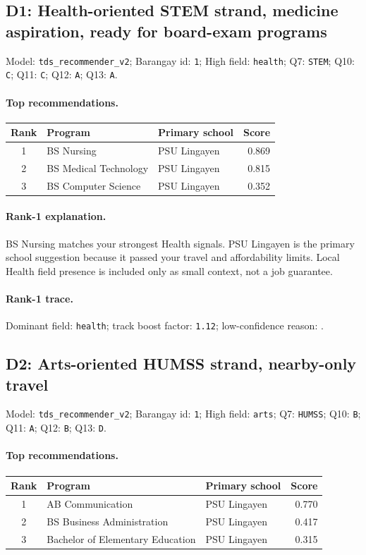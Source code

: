 \subsection*{D1: Health-oriented STEM strand, medicine aspiration, ready for board-exam programs}
\noindent Model: \texttt{tds\_recommender\_v2}; Barangay id: \texttt{1}; High field: \texttt{health}; Q7: \texttt{STEM}; Q10: \texttt{C}; Q11: \texttt{C}; Q12: \texttt{A}; Q13: \texttt{A}.

\paragraph{Top recommendations.}
\begingroup\small\setlength{\tabcolsep}{6pt}
\noindent\begin{tabular}{@{}c p{4.4cm} p{4.4cm} r@{}}
\toprule
Rank & Program & Primary school & Score \\
\midrule
1 & BS Nursing & PSU Lingayen & 0.869 \\
2 & BS Medical Technology & PSU Lingayen & 0.815 \\
3 & BS Computer Science & PSU Lingayen & 0.352 \\
\bottomrule
\end{tabular}\endgroup

\paragraph{Rank-1 explanation.}
BS Nursing matches your strongest Health signals. PSU Lingayen is the primary school suggestion because it passed your travel and affordability limits. Local Health field presence is included only as small context, not a job guarantee.

\paragraph{Rank-1 trace.}
Dominant field: \texttt{health}; track boost factor: \texttt{1.12}; low-confidence reason: \texttt{}.


\subsection*{D2: Arts-oriented HUMSS strand, nearby-only travel}
\noindent Model: \texttt{tds\_recommender\_v2}; Barangay id: \texttt{1}; High field: \texttt{arts}; Q7: \texttt{HUMSS}; Q10: \texttt{B}; Q11: \texttt{A}; Q12: \texttt{B}; Q13: \texttt{D}.

\paragraph{Top recommendations.}
\begingroup\small\setlength{\tabcolsep}{6pt}
\noindent\begin{tabular}{@{}c p{4.4cm} p{4.4cm} r@{}}
\toprule
Rank & Program & Primary school & Score \\
\midrule
1 & AB Communication & PSU Lingayen & 0.770 \\
2 & BS Business Administration & PSU Lingayen & 0.417 \\
3 & Bachelor of Elementary Education & PSU Lingayen & 0.315 \\
\bottomrule
\end{tabular}\endgroup

